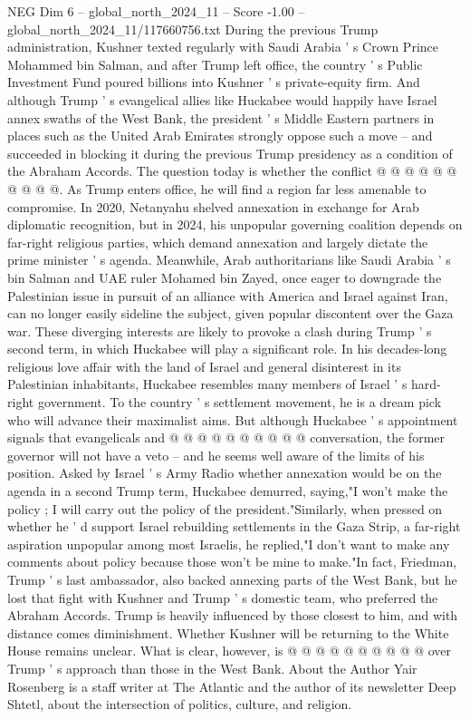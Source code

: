 \begin{textsample}{NEG Dim 6 – global\_north\_2024\_11 – Score -1.00 – global\_north\_2024\_11/117660756.txt}
During the previous Trump administration, Kushner texted regularly with Saudi Arabia ' s Crown Prince Mohammed bin Salman, and after Trump left office, the country ' s Public Investment Fund poured billions into Kushner ' s private-equity firm.
And although Trump ' s evangelical allies like Huckabee would happily have Israel annex swaths of the West Bank, the president ' s Middle Eastern partners in places such as the United Arab Emirates strongly oppose such a move -- and succeeded in blocking it during the previous Trump presidency as a condition of the Abraham Accords.
The question today is whether the conflict @ @ @ @ @ @ @ @ @ @.
As Trump enters office, he will find a region far less amenable to compromise.
In 2020, Netanyahu shelved annexation in exchange for Arab diplomatic recognition, but in 2024, his unpopular governing coalition depends on far-right religious parties, which demand annexation and largely dictate the prime minister ' s agenda.
Meanwhile, Arab authoritarians like Saudi Arabia ' s bin Salman and UAE ruler Mohamed bin Zayed, once eager to downgrade the Palestinian issue in pursuit of an alliance with America and Israel against Iran, can no longer easily sideline the subject, given popular discontent over the Gaza war.
These diverging interests are likely to provoke a clash during Trump ' s second term, in which Huckabee will play a significant role.
In his decades-long religious love affair with the land of Israel and general disinterest in its Palestinian inhabitants, Huckabee resembles many members of Israel ' s hard-right government.
To the country ' s settlement movement, he is a dream pick who will advance their maximalist aims.
But although Huckabee ' s appointment signals that evangelicals and @ @ @ @ @ @ @ @ @ @ conversation, the former governor will not have a veto -- and he seems well aware of the limits of his position.
Asked by Israel ' s Army Radio whether annexation would be on the agenda in a second Trump term, Huckabee demurred, saying,"I won't make the policy ; I will carry out the policy of the president."Similarly, when pressed on whether he ' d support Israel rebuilding settlements in the Gaza Strip, a far-right aspiration unpopular among most Israelis, he replied,"I don't want to make any comments about policy because those won't be mine to make."In fact, Friedman, Trump ' s last ambassador, also backed annexing parts of the West Bank, but he lost that fight with Kushner and Trump ' s domestic team, who preferred the Abraham Accords.
Trump is heavily influenced by those closest to him, and with distance comes diminishment.
Whether Kushner will be returning to the White House remains unclear.
What is clear, however, is @ @ @ @ @ @ @ @ @ @ over Trump ' s approach than those in the West Bank.
About the Author Yair Rosenberg is a staff writer at The Atlantic and the author of its newsletter Deep Shtetl, about the intersection of politics, culture, and religion.

\end{textsample}
